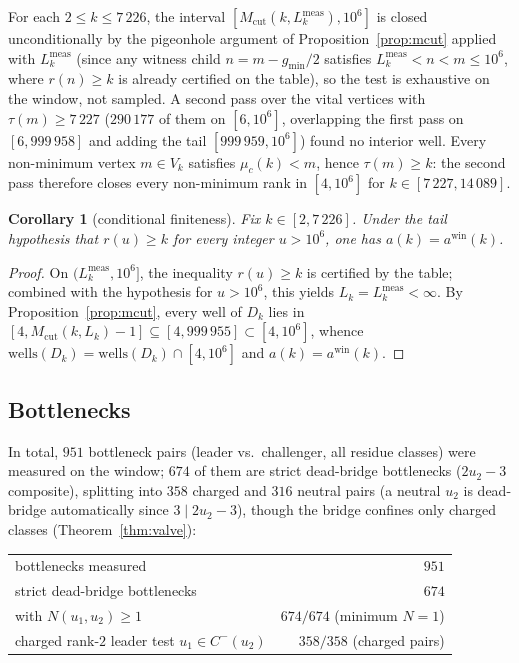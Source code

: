 \documentclass[11pt]{article}
\theoremstyle{plain}
\newtheorem{corollary}[theorem]{Corollary}
\theoremstyle{definition}
\newcommand{\rch}{r}
\newcommand{\Vk}{V_{k}}
\newcommand{\Dk}{D_{k}}
\newcommand{\Mcut}{M_{\mathrm{cut}}}
\newcommand{\wells}{\mathrm{wells}}
\begin{document}
For each $2 \le k \le 7\,226$, the interval
$[\Mcut(k, L_k^{\mathrm{meas}}), 10^{6}]$ is closed
unconditionally by the pigeonhole argument of
Proposition~\ref{prop:mcut} applied with $L_k^{\mathrm{meas}}$
(since any witness child $n = m - g_{\min}/2$ satisfies
$L_k^{\mathrm{meas}} < n < m \le 10^{6}$, where $\rch(n) \ge k$ is
already certified on the table), so the test is exhaustive on the
window, not sampled.
A second pass over the vital vertices with $\tau(m) \ge 7\,227$ ($290\,177$
of them on $[6, 10^{6}]$, overlapping the first pass on
$[6, 999\,958]$ and adding the tail $[999\,959, 10^{6}]$) found no
interior well. Every non-minimum vertex $m \in \Vk$ satisfies
$\mu_c(k) < m$, hence $\tau(m) \ge k$: the second pass therefore
closes every non-minimum rank in $[4,10^6]$ for
$k \in [7\,227, 14\,089]$.

\begin{corollary}[conditional finiteness]\label{cor:H}
Fix $k \in [2, 7\,226]$. Under the tail hypothesis that
$\rch(u) \ge k$ for every integer $u > 10^{6}$, one has
$a(k) = a^{\mathrm{win}}(k)$.
\end{corollary}

\begin{proof}
On $(L_k^{\mathrm{meas}}, 10^{6}]$, the inequality $\rch(u) \ge k$
is certified by the table; combined with the hypothesis for
$u > 10^{6}$, this yields $L_k = L_k^{\mathrm{meas}} < \infty$. By
Proposition~\ref{prop:mcut}, every well of $\Dk$ lies in
$[4, \Mcut(k,L_k) - 1] \subseteq [4, 999\,955] \subset [4, 10^{6}]$,
whence $\wells(\Dk) = \wells(\Dk) \cap [4, 10^{6}]$ and
$a(k) = a^{\mathrm{win}}(k)$.
\end{proof}

\subsection{Bottlenecks}
\label{sec:bottlenecks}

In total, $951$ bottleneck pairs (leader vs.\ challenger, all
residue classes) were measured on the window; $674$ of them are strict
dead-bridge bottlenecks ($2u_2 - 3$ composite), splitting into
$358$ charged and $316$ neutral pairs (a neutral $u_2$ is
dead-bridge automatically since $3 \mid 2u_2 - 3$), though the
bridge confines only charged classes
(Theorem~\ref{thm:valve}):

\begin{center}
\begin{tabular}{@{}lr@{}}
\toprule
bottlenecks measured & $951$\\
strict dead-bridge bottlenecks & $674$\\
\quad with $N(u_1,u_2) \ge 1$ & $674/674$ (minimum $N = 1$)\\
charged rank-$2$ leader test $u_1 \in C^{-}(u_2)$ & $358/358$ (charged pairs)\\
\bottomrule
\end{tabular}
\end{center}
\end{document}
